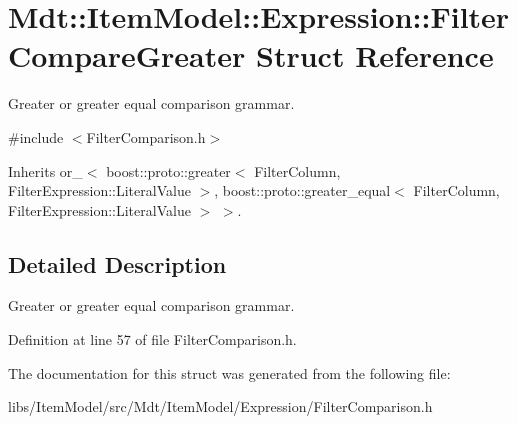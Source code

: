 \hypertarget{struct_mdt_1_1_item_model_1_1_expression_1_1_filter_compare_greater}{}\section{Mdt\+:\+:Item\+Model\+:\+:Expression\+:\+:Filter\+Compare\+Greater Struct Reference}
\label{struct_mdt_1_1_item_model_1_1_expression_1_1_filter_compare_greater}


Greater or greater equal comparison grammar.  




{\ttfamily \#include $<$Filter\+Comparison.\+h$>$}



Inherits or\+\_\+$<$ boost\+::proto\+::greater$<$ Filter\+Column, Filter\+Expression\+::\+Literal\+Value $>$, boost\+::proto\+::greater\+\_\+equal$<$ Filter\+Column, Filter\+Expression\+::\+Literal\+Value $>$ $>$.



\subsection{Detailed Description}
Greater or greater equal comparison grammar. 

Definition at line 57 of file Filter\+Comparison.\+h.



The documentation for this struct was generated from the following file\+:\begin{DoxyCompactItemize}
\item 
libs/\+Item\+Model/src/\+Mdt/\+Item\+Model/\+Expression/Filter\+Comparison.\+h\end{DoxyCompactItemize}
